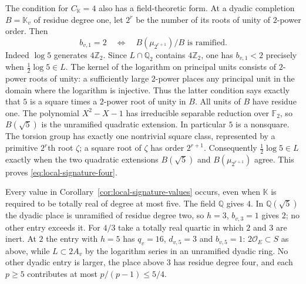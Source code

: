 \documentclass[11pt,letterpaper]{article}
\theoremstyle{definition}
\numberwithin{equation}{section}
\begin{document}
The condition for $C_{\mathbb K}=4$ also has a field-theoretic
form. At a dyadic completion $B=\mathbb K_v$ of residue degree one,
let $2^r$ be the number of its roots of unity of $2$-power order.
Then
\begin{equation}\label{eq:local-signature-four}
 b_{v,1}=2\quad\Longleftrightarrow\quad
                  B(\mu_{2^{r+1}})/B\text{ is ramified}.
\end{equation}
Indeed $\log5$ generates $4\mathbb Z_2$. Since $L\cap\mathbb Q_2$
contains $4\mathbb Z_2$, one has $b_{v,1}<2$ precisely when
$\tfrac12\log5\in L$. The kernel of the logarithm on principal units
consists of $2$-power roots of unity: a sufficiently large $2$-power
places any principal unit in the domain where the logarithm is injective.
Thus the latter condition says exactly that $5$ is a square times a
$2$-power root of unity in $B$. All units of $B$ have residue one.
The polynomial $X^2-X-1$ has irreducible separable reduction over
$\mathbb F_2$, so $B(\sqrt5)$ is the unramified quadratic extension.
In particular $5$ is a nonsquare. The torsion group has exactly one
nontrivial square class, represented by a primitive $2^r$th root
$\zeta$; a square root of $\zeta$ has order $2^{r+1}$. Consequently
$\tfrac12\log5\in L$ exactly when the two quadratic extensions
$B(\sqrt5)$ and $B(\mu_{2^{r+1}})$ agree. This proves
\eqref{eq:local-signature-four}.

Every value in Corollary~\ref{cor:local-signature-values} occurs,
even when $\mathbb K$ is required to be totally real of degree at
most five. The field $\mathbb Q$ gives $4$. In $\mathbb Q(\sqrt5)$
the dyadic place is unramified of residue degree two, so $h=3$,
$b_{v,3}=1$ gives $2$; no other entry exceeds it. For $4/3$ take a
totally real quartic in which $2$ and $3$ are inert. At $2$ the
entry with $h=5$ has $q_v=16$, $d_{v,5}=3$ and $b_{v,5}=1$:
$2\mathcal O_E\subset S$ as above, while $L\subset 2A_v$ by the
logarithm series in an unramified dyadic ring. No other dyadic entry
is larger, the place above $3$ has residue degree four, and each
$p\ge5$ contributes at most $p/(p-1)\le5/4$.
\end{document}
